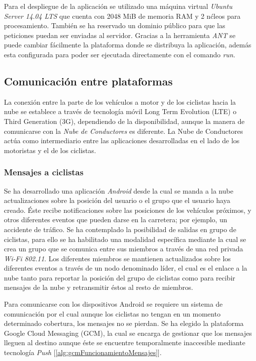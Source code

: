 Para el despliegue de la aplicación se utilizado una máquina virtual \emph{Ubuntu Server 14.04 LTS} que cuenta con 2048 MiB de memoria RAM y 2 n\'cleos para procesamiento. También se ha reservado un dominio público para que las peticiones puedan ser enviadas al servidor. Gracias a la herramienta \emph{ANT} se puede cambiar fácilmente la plataforma donde se distribuya la aplicación, además esta configurada para poder ser ejecutada directamente con el comando \emph{run}.


\subsection{Comunicación entre plataformas}\label{ssection:comunicacion_plataformas}
La conexión entre la parte de los vehículos a motor y de los ciclistas hacia la nube se establece a través de tecnología móvil Long Term Evolution (LTE) o Third Generation (3G), dependiendo de la disponibilidad, aunque la manera de comunicarse con la \emph{Nube de Conductores} es diferente. La Nube de Conductores actúa como intermediario entre las aplicaciones desarrolladas en el lado de los motoristas y el de los ciclistas.

\subsubsection{Mensajes a ciclistas}\label{sssection:mensajes_ciclistas}
Se ha desarrollado una aplicación \emph{Android} desde la cual se manda a la nube actualizaciones sobre la posición del usuario o el grupo que el usuario haya creado. \'Este recibe notificaciones sobre las posiciones de los vehículos próximos, y otros diferentes eventos que pueden darse en la carretera; por ejemplo, un accidente de tráfico. Se ha contemplado la posibilidad de salidas en grupo de ciclistas, para ello se ha habilitado una modalidad específica mediante la cual se crea un grupo que se comunica entre sus miembros a través de una red privada \emph{Wi-Fi 802.11}. Los diferentes miembros se mantienen actualizados sobre los diferentes eventos a través de un nodo denominado líder, el cual es el enlace a la nube tanto para reportar la posición del grupo de ciclistas como para recibir mensajes de la nube y retransmitir éstos al resto de miembros.

Para comunicarse con los dispositivos Android se requiere un sistema de comunicación por el cual aunque los ciclistas no tengan en un momento determinado cobertura, los mensajes no se pierdan. Se ha elegido la plataforma Google Cloud Messaging (GCM), la cual se encarga de gestionar que los mensajes lleguen al destino aunque éste se encuentre temporalmente inaccesible mediante tecnología \emph{Push} [\ref{alg:gcmFuncionamientoMensajes}]. 

